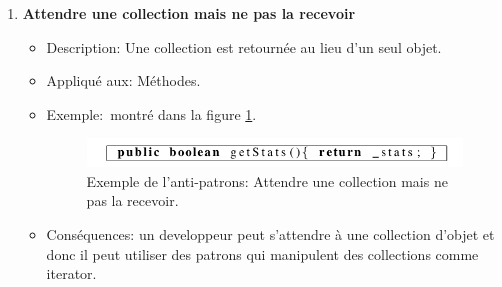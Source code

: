 \begin{enumerate}
\item \textbf{Attendre une collection mais ne pas la recevoir}
\begin{itemize}
\item Description: Une collection est retournée au lieu d’un seul objet.
\item Appliqué aux: Méthodes.
\item Exemple: montré dans la figure \ref{fig:deux_six}.
\begin{figure}[H]
	\centering
\includegraphics[width=0.9\linewidth]{Others/Resources/deux_six.png}
	\caption{Exemple de l'anti-patrons: Attendre une collection mais ne pas la recevoir\cite{arnaoudova2013new}.}
		\label{fig:deux_six}
	\end{figure}
\item Conséquences: un developpeur peut s’attendre à une collection d’objet et donc il peut utiliser des patrons qui manipulent des collections comme iterator.
\end{itemize}
\end{enumerate}

